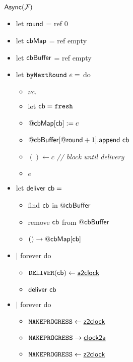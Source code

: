 \begin{figure}[h!]
\begin{boxedminipage}{\columnwidth}
\begin{centering}
\textbf{$\msf{Async}(\F{})$} \\
\end{centering}
\small
\begin{itemize}[leftmargin=2mm]
  \item[] let ${\mathsf {round}}$ = ref 0
  \item[] let ${\mathsf {cbMap}}$ = ref empty
  \item[] let ${\mathsf {cbBuffer}}$ = ref empty
  \item[] let $\mathtt {byNextRound} ~e = $ do
    \begin{itemize}[leftmargin=3mm]
    \item[] $\nu c.$
    \item[] let ${\mathsf {cb}} = \mathtt {fresh}$
    \item[] $@{\mathsf {cbMap}}[{\mathsf {cb}}] := c$
    \item[] $@{\mathsf {cbBuffer}}[@{\mathsf {round}}+1].{\mathsf {append}}~ {\mathsf {cb}}$
    \item[] $() \leftarrow c$ \emph{// block until delivery}
    \item[] $e$
    \end{itemize}
  \item[] let ${\mathsf {deliver}}~ {\mathsf {cb}} =$
    \begin{itemize}[leftmargin=3mm]
    \item[] find ${\mathsf {cb}}$ in $@{\mathsf {cbBuffer}}$
    \item[] remove ${\mathsf {cb}}$ from $@{\mathsf {cbBuffer}}$
    \item[] $() \rightarrow @{\mathsf {cbMap}}[{\mathsf {cb}}]$
    \end{itemize}
  \item[] $|$ forever do
    \begin{itemize}[leftmargin=3mm]
    \item[] $\mathtt {DELIVER}({\mathsf {cb}}) \leftarrow {\underline{\smash{\ensuremath{{\mathsf {a2clock}}}}}}$
    \item[] ${\mathsf {deliver}}~{\mathsf {cb}}$
    \end{itemize}
  \item[] $|$  forever do
    \begin{itemize}[leftmargin=3mm]
      \item[] $\mathtt {MAKEPROGRESS} \leftarrow {\underline{\smash{\ensuremath{{\mathsf {z2clock}}}}}}$
      \item[] $\mathtt {MAKEPROGRESS} \rightarrow {\underline{\smash{\ensuremath{{\mathsf {clock2a}}}}}}$
      \item[] $\mathtt {MAKEPROGRESS} \leftarrow {\underline{\smash{\ensuremath{{\mathsf {z2clock}}}}}}$

\end{itemize}
\end{itemize}
\end{boxedminipage}
\end{figure}
